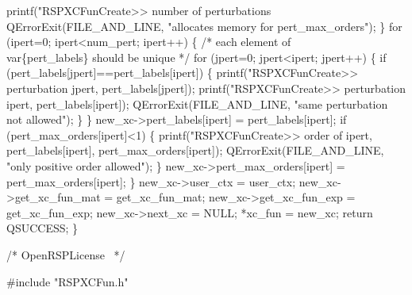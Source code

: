         printf("RSPXCFunCreate>> number of perturbations %
        QErrorExit(FILE_AND_LINE, "allocates memory for pert_max_orders");
    \}
    for (ipert=0; ipert<num_pert; ipert++) \{
        /* each element of \\var\{pert_labels\} should be unique */
        for (jpert=0; jpert<ipert; jpert++) \{
            if (pert_labels[jpert]==pert_labels[ipert]) \{
                printf("RSPXCFunCreate>> perturbation %
                       jpert,
                       pert_labels[jpert]);
                printf("RSPXCFunCreate>> perturbation %
                       ipert,
                       pert_labels[ipert]);
                QErrorExit(FILE_AND_LINE, "same perturbation not allowed");
            \}
        \}
        new_xc->pert_labels[ipert] = pert_labels[ipert];
        if (pert_max_orders[ipert]<1) \{
            printf("RSPXCFunCreate>> order of %
                   ipert,
                   pert_labels[ipert],
                   pert_max_orders[ipert]);
            QErrorExit(FILE_AND_LINE, "only positive order allowed");
        \}
        new_xc->pert_max_orders[ipert] = pert_max_orders[ipert];
    \}
    new_xc->user_ctx = user_ctx;
    new_xc->get_xc_fun_mat = get_xc_fun_mat;
    new_xc->get_xc_fun_exp = get_xc_fun_exp;
    new_xc->next_xc = NULL;
    *xc_fun = new_xc;
    return QSUCCESS;
\}

\nwendcode{}\endmoddef
/*
  \LA{}OpenRSPLicense~{\nwtagstyle{}}\RA{}
*/

#include "RSPXCFun.h"

